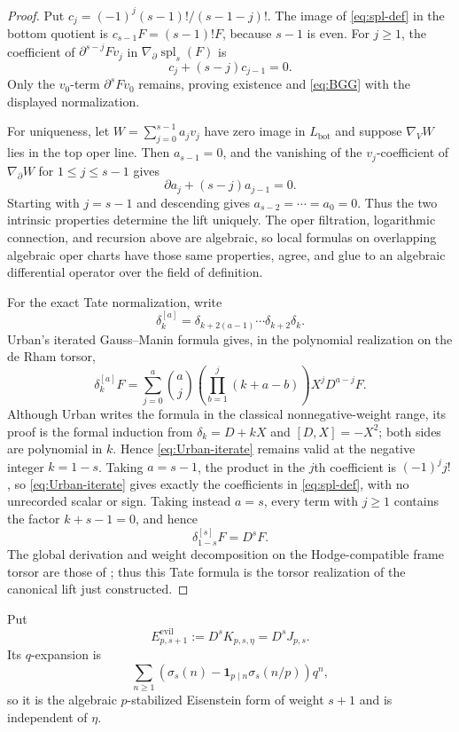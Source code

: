 \documentclass[11pt]{article}
\theoremstyle{definition}
\theoremstyle{remark}
\begin{document}
\begin{proof}
Put $c_j=(-1)^j(s-1)!/(s-1-j)!$.  The image of
\eqref{eq:spl-def} in the bottom quotient is $c_{s-1}F=(s-1)!F$, because
$s-1$ is even.  For $j\ge1$, the coefficient of
$\partial^{s-j}Fv_j$ in $\nabla_\partial\operatorname{spl}_s(F)$ is
\[
 c_j+(s-j)c_{j-1}=0.
\]
Only the $v_0$-term $\partial^sFv_0$ remains, proving existence and
\eqref{eq:BGG} with the displayed normalization.

For uniqueness, let $W=\sum_{j=0}^{s-1}a_jv_j$ have zero image in
$L_{\mathrm{bot}}$ and suppose $\nabla_VW$ lies in the top oper line.  Then
$a_{s-1}=0$, and the vanishing of the $v_j$-coefficient of $\nabla_\partial W$
for $1\le j\le s-1$ gives
\[
 \partial a_j+(s-j)a_{j-1}=0.
\]
Starting with $j=s-1$ and descending gives
$a_{s-2}=\cdots=a_0=0$.  Thus the two intrinsic properties determine the
lift uniquely.  The oper filtration, logarithmic connection, and recursion
above are algebraic, so local formulas on overlapping algebraic oper charts
have those same properties, agree, and glue to an algebraic differential
operator over the field of definition.

For the exact Tate normalization, write
\[
 \delta_k^{[a]}=
 \delta_{k+2(a-1)}\cdots\delta_{k+2}\delta_k.
\]
Urban's iterated Gauss--Manin formula
\cite[Proposition~2.4.1 and Remark~2.4.2]{Urban2013} gives, in the
polynomial realization on the de Rham torsor,
\begin{equation}\label{eq:Urban-iterate}
 \delta_k^{[a]}F
 =\sum_{j=0}^{a}\binom aj
   \left(\prod_{b=1}^{j}(k+a-b)\right)
   X^jD^{a-j}F.
\end{equation}
Although Urban writes the formula in the classical nonnegative-weight range,
its proof is the formal induction from $\delta_k=D+kX$ and
$[D,X]=-X^2$; both sides are polynomial in $k$.  Hence
\eqref{eq:Urban-iterate} remains valid at the negative integer
$k=1-s$.  Taking $a=s-1$, the product in the $j$th coefficient is
$(-1)^j j!$, so \eqref{eq:Urban-iterate} gives exactly the coefficients in
\eqref{eq:spl-def}, with no unrecorded scalar or sign.  Taking instead
$a=s$, every term with $j\ge1$ contains the factor $k+s-1=0$, and hence
\[
 \delta_{1-s}^{[s]}F=D^sF.
\]
The global derivation and weight decomposition on the Hodge-compatible frame
torsor are those of \cite[Propositions~A.14--A.15]{GPRJ2025}; thus this Tate
formula is the torsor realization of the canonical lift just constructed.
\end{proof}

Put
\begin{equation}\label{eq:Eevil}
 E_{p,s+1}^{\mathrm{evil}}:=D^sK_{p,s,\eta}=D^sJ_{p,s}.
\end{equation}
Its $q$-expansion is
\[
 \sum_{n\ge1}
 \left(\sigma_s(n)-\mathbf1_{p\mid n}\sigma_s(n/p)\right)q^n,
\]
so it is the algebraic $p$-stabilized Eisenstein form of weight $s+1$ and is
independent of $\eta$.
\end{document}
